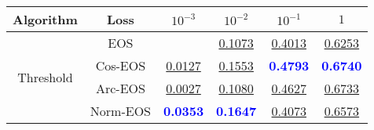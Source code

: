 \begin{table}[t]
\centering
\begin{tabularx}{.7\textwidth}{c|c|cccc}
\bf Algorithm & \bf Loss & $10^{-3}$ & $10^{-2}$ & $10^{-1}$ & $1$\\\hline\hline
\multirow{4}{*}{Threshold} & EOS & & \underline{0.1073} & \underline{0.4013} & \underline{0.6253}\\
 & Cos-EOS & \underline{0.0127} & \underline{0.1553} & \textcolor{blue}{\bf 0.4793} & \textcolor{blue}{\bf 0.6740}\\
 & Arc-EOS & \underline{0.0027} & \underline{0.1080} & \underline{0.4627} & \underline{0.6733}\\
 & Norm-EOS & \textcolor{blue}{\bf 0.0353} & \textcolor{blue}{\bf 0.1647} & \underline{0.4073} & \underline{0.6573}\\
\hline
\end{tabularx}
\end{table}